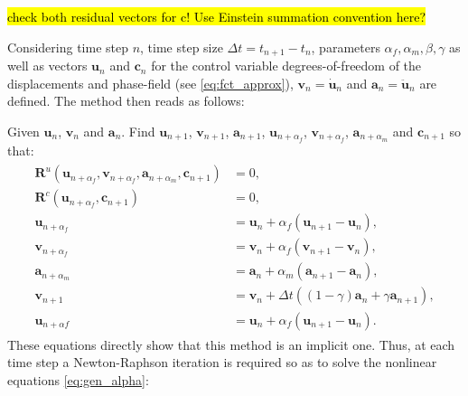 \hl{check both residual vectors for c! Use Einstein summation convention here?}

Considering time step $n$, time step size $\Delta t = t_{n+1}-t_{n}$, parameters $\alpha_{f},\alpha_{m},\beta,\gamma$ as well as vectors $\mathbf{u}_{n}$ and $\mathbf{c}_{n}$ for the control variable degrees-of-freedom of the displacements and phase-field (see \eqref{eq:fct_approx}), $\textbf{v}_{n}=\dot{\mathbf{u}}_{n}$ and $\mathbf{a}_{n}=\ddot{\mathbf{u}}_{n}$ are defined. The method then reads as follows:

Given $\mathbf{u}_{n}$, $\mathbf{v}_{n}$ and $\mathbf{a}_{n}$. Find $\mathbf{u}_{n+1}$, $\mathbf{v}_{n+1}$, $\mathbf{a}_{n+1}$, $\mathbf{u}_{n+\alpha_{f}}$, $\mathbf{v}_{n+\alpha_{f}}$, $\mathbf{a}_{n+\alpha_{m}}$ and $\mathbf{c}_{n+1}$ so that:
\begin{equation} \label{eq:gen_alpha}
\begin{aligned}
\begin{alignedat}{1}
        \mathbf{R}^{u}\left(\mathbf{u}_{n+\alpha_{f}},\mathbf{v}_{n+\alpha_{f}},\mathbf{a}_{n+\alpha_{m}},\mathbf{c}_{n+1}\right) &= 0, \\
    	\mathbf{R}^{c}\left(\mathbf{u}_{n+\alpha_{f}},\mathbf{c}_{n+1}\right) &= 0, \\
        \mathbf{u}_{n+\alpha_{f}} &= \mathbf{u}_{n}+\alpha_{f}\left(\mathbf{u}_{n+1}-\mathbf{u}_{n}\right), \\      
        \mathbf{v}_{n+\alpha_{f}} &= \mathbf{v}_{n}+\alpha_{f}\left(\mathbf{v}_{n+1}-\mathbf{v}_{n}\right), \\
        \mathbf{a}_{n+\alpha_{m}} &= \mathbf{a}_{n}+\alpha_{m}\left(\mathbf{a}_{n+1}-\mathbf{a}_{n}\right), \\
        \mathbf{v}_{n+1} &= \mathbf{v}_{n}+\Delta t\left(\left(1-\gamma\right)\mathbf{a}_{n}+\gamma\mathbf{a}_{n+1}\right), \\  
        \mathbf{u}_{n+\alpha f} &= \mathbf{u}_{n}+\alpha_{f}\left(\mathbf{u}_{n+1}-\mathbf{u}_{n}\right).
\end{alignedat}
\end{aligned}
\end{equation}
These equations directly show that this method is an implicit one. Thus, at each time step a Newton-Raphson iteration is required so as to solve the nonlinear equations \eqref{eq:gen_alpha}:

